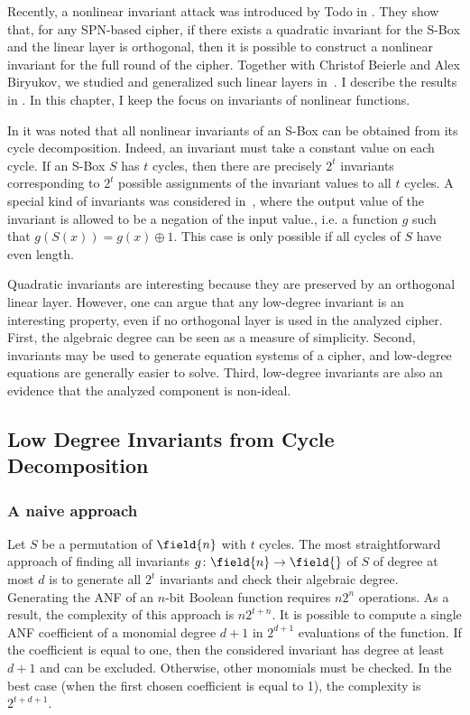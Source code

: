 
Recently, a nonlinear invariant attack was introduced by Todo \etal{} in \cite{NonlinInv}. They show that, for any SPN-based cipher, if there exists a quadratic invariant for the S-Box and  the linear layer is orthogonal, then it is possible to construct a nonlinear invariant for the full round of the cipher. Together with Christof Beierle and Alex Biryukov, we studied and generalized such linear layers in~\cite{OurNLI}. I describe the results in . In this chapter, I keep the focus on invariants of nonlinear functions. 

In \cite{NonlinInv} it was noted that all nonlinear invariants of an S-Box can be obtained from its cycle decomposition. Indeed, an invariant must take a constant value on each cycle. If an S-Box $S$ has $t$ cycles, then there are precisely $2^t$ invariants corresponding to $2^t$ possible assignments of the invariant values to all $t$ cycles. A special kind of invariants was considered in~\cite{NonlinInv}, where the output value of the invariant is allowed to be a negation of the input value., i.e. a function $g$ such that $g(S(x)) = g(x) \oplus 1$. This case is only possible if all cycles of $S$ have even length.

Quadratic invariants are interesting because they are preserved by an orthogonal linear layer. However, one can argue that any low-degree invariant is an interesting property, even if no orthogonal layer is used in the analyzed cipher. First, the algebraic degree can be seen as a measure of simplicity. Second, invariants may be used to generate equation systems of a cipher, and low-degree equations are generally easier to solve. Third, low-degree invariants are also an evidence that the analyzed component is non-ideal.

\subsection{Low Degree Invariants from Cycle Decomposition}

\subsubsection{A naive approach}
Let $S$ be a permutation of $\field{n}$ with $t$ cycles. The most straightforward approach of finding all invariants $g\colon \field{n} \to \field{}$ of $S$ of degree at most $d$ is to generate all $2^t$ invariants and check their algebraic degree. Generating the ANF of an $n$-bit Boolean function requires $n2^n$ operations. As a result, the complexity of this approach is $n2^{t+n}$. It is possible to compute a single ANF coefficient of a monomial degree $d+1$ in $2^{d+1}$ evaluations of the function. If the coefficient is equal to one, then the considered invariant has degree at least $d+1$ and can be excluded. Otherwise, other monomials must be checked. In the best case (when the first chosen coefficient is equal to 1), the complexity is $2^{t+d+1}$.

